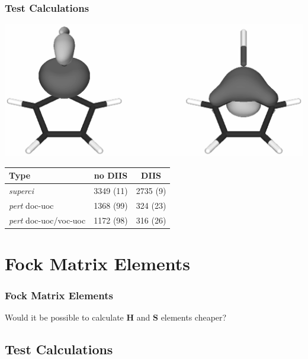 \documentclass[]{beamer}
\begin{document}
\begin{frame}
  \frametitle{Test Calculations}
  \begin{center}
    \includegraphics[scale=0.5]{figures/sigma_sih.eps}  
  \end{center}
  \begin{table}
  \begin{center}
    \begin{tabular}{l c c}
      \hline
      Type & no DIIS & DIIS \\
      \hline
      \textit{superci} & 3349 (11) & 2735 (9) \\ 
      \textit{pert} doc-uoc & 1368 (99) & 324 (23)\\ 
      \textit{pert} doc-uoc/voc-uoc & 1172 (98) & 316 (26)\\
    \end{tabular}
  \end{center}
\end{table}
\end{frame}

\section{Fock Matrix Elements}

\begin{frame}
  \frametitle{Fock Matrix Elements}
  Would it be possible to calculate $\mathbf{H}$ and $\mathbf{S}$ elements cheaper?
\end{frame}

\subsection{Test Calculations}
\end{document}
